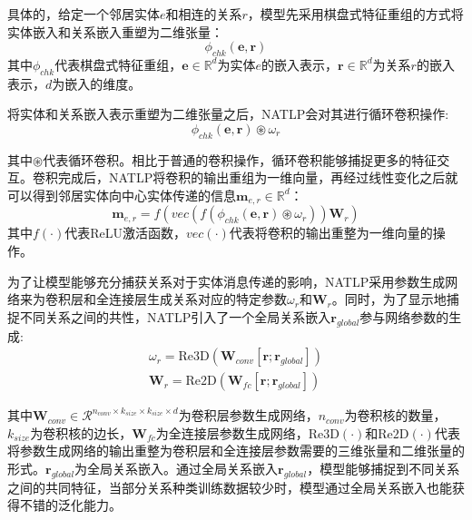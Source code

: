具体的，给定一个邻居实体$e$和相连的关系$r$，模型先采用棋盘式特征重组的方式将实体嵌入和关系嵌入重塑为二维张量：
\begin{equation}
  \phi_{chk}\left(\boldsymbol{e},\boldsymbol{r}\right) 
\end{equation}
其中$\phi_{chk}$代表棋盘式特征重组，$\boldsymbol{e} \in \mathbb{R} ^d$为实体$e$的嵌入表示，$\boldsymbol{r} \in \mathbb{R}^d$为关系$r$的嵌入表示，$d$为嵌入的维度。

将实体和关系嵌入表示重塑为二维张量之后，NATLP会对其进行循环卷积操作:
\begin{equation}
  \phi_{chk}\left(\boldsymbol{e},\boldsymbol{r}\right) \circledast \omega_r
\end{equation}

其中$\circledast$代表循环卷积。相比于普通的卷积操作，循环卷积能够捕捉更多的特征交互。卷积完成后，NATLP将卷积的输出重组为一维向量，再经过线性变化之后就可以得到邻居实体向中心实体传递的信息$\boldsymbol{m}_{e,r} \in \mathbb{R} ^d$：
\begin{equation}
  \boldsymbol{m}_{e,r}=f\left(vec\left(f\left(\phi_{chk}\left(\boldsymbol{e},\boldsymbol{r}\right) \circledast \omega_r \right)\right)\mathbf{W}_r\right)
\end{equation}
其中$f(\cdot )$代表ReLU激活函数，$vec(\cdot)$代表将卷积的输出重整为一维向量的操作。

为了让模型能够充分捕获关系对于实体消息传递的影响，NATLP采用参数生成网络来为卷积层和全连接层生成关系对应的特定参数$\omega_r$和$\mathbf{W}_r$。同时，为了显示地捕捉不同关系之间的共性，NATLP引入了一个全局关系嵌入$\boldsymbol{r}_{global}$参与网络参数的生成:
\begin{gather}
  \omega_r = \mbox{Re3D}\left(\mathbf{W}_{conv}\left[\boldsymbol{r};\boldsymbol{r}_{global}\right]\right) \\
  \mathbf{W}_r = \mbox{Re2D}\left(\mathbf{W}_{fc}\left[\boldsymbol{r};\boldsymbol{r}_{global}\right]\right)
\end{gather}

其中$\mathbf{W}_{conv} \in \mathcal{R}^{n_{conv}\times k_{size} \times k_{size} \times d}$为卷积层参数生成网络，$n_{conv}$为卷积核的数量，$k_{size}$为卷积核的边长，$\mathbf{W}_{fc}$为全连接层参数生成网络，$\mbox{Re3D}(\cdot)$和$\mbox{Re2D}(\cdot)$代表将参数生成网络的输出重整为卷积层和全连接层参数需要的三维张量和二维张量的形式。$\boldsymbol{r}_{global}$为全局关系嵌入。通过全局关系嵌入$\boldsymbol{r}_{global}$，模型能够捕捉到不同关系之间的共同特征，当部分关系种类训练数据较少时，模型通过全局关系嵌入也能获得不错的泛化能力。

